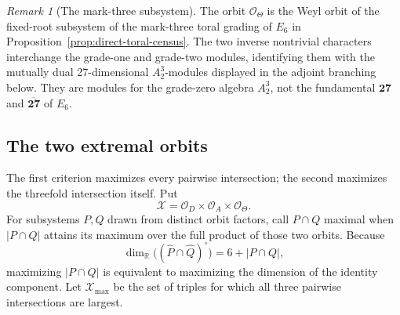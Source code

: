 \documentclass[11pt]{article}
\theoremstyle{remark}
\newtheorem*{remark}{Remark}
\begin{document}
\begin{remark}[The mark-three subsystem]
The orbit \(\mathcal O_\Theta\) is the Weyl orbit of the fixed-root
subsystem of the mark-three toral grading of \(E_6\) in
Proposition~\ref{prop:direct-toral-census}.  The two inverse nontrivial
characters interchange the grade-one and grade-two modules, identifying
them with the mutually dual 27-dimensional \(A_2^3\)-modules displayed in
the adjoint branching below.  They are modules for the grade-zero algebra
\(A_2^3\), not the fundamental \(\mathbf{27}\) and
\(\overline{\mathbf{27}}\) of \(E_6\).
\end{remark}

\subsection{The two extremal orbits}

The first criterion maximizes every pairwise intersection; the second
maximizes the threefold intersection itself. Put
\[
 \mathcal X=\mathcal O_D\times\mathcal O_A\times\mathcal O_\Theta.
\]
For subsystems \(P,Q\) drawn from distinct orbit factors, call
\(P\cap Q\) maximal when \(\lvert P\cap Q\rvert\) attains its maximum
over the full product of those two orbits. Because
\[
 \dim_{\mathbb R}\bigl((\widehat P\cap\widehat Q)^\circ\bigr)
 =6+\lvert P\cap Q\rvert,
\]
maximizing \(\lvert P\cap Q\rvert\) is equivalent to maximizing the
dimension of the identity component. Let \(\mathcal X_{\max}\) be the set of
triples for which all three pairwise intersections are largest.
\end{document}
